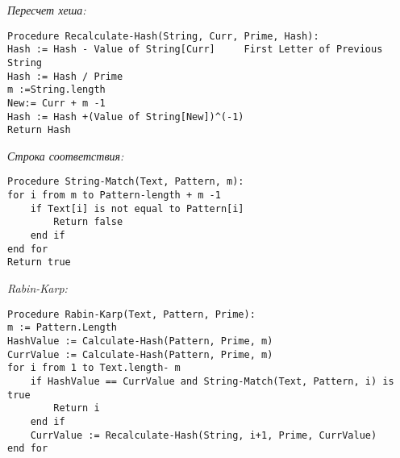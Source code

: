 \textit{Пересчет хеша:}

\vspace{\baselineskip}
\begin{tcolorbox}
\begin{verbatim}
Procedure Recalculate-Hash(String, Curr, Prime, Hash):
Hash := Hash - Value of String[Curr]	 First Letter of Previous String
Hash := Hash / Prime
m :=String.length
New:= Curr + m -1
Hash := Hash +(Value of String[New])^(-1)
Return Hash
\end{verbatim}
\end{tcolorbox}
\vspace{\baselineskip}

\textit{Строка соответствия:}

\vspace{\baselineskip}
\begin{tcolorbox}
\begin{verbatim}
Procedure String-Match(Text, Pattern, m):
for i from m to Pattern-length + m -1
	if Text[i] is not equal to Pattern[i]
		Return false
	end if
end for
Return true
\end{verbatim}
\end{tcolorbox}
\vspace{\baselineskip}

\textit{Rabin-Karp:}

\vspace{\baselineskip}
\begin{tcolorbox}
\begin{verbatim}
Procedure Rabin-Karp(Text, Pattern, Prime):
m := Pattern.Length
HashValue := Calculate-Hash(Pattern, Prime, m)
CurrValue := Calculate-Hash(Pattern, Prime, m)
for i from 1 to Text.length- m
	if HashValue == CurrValue and String-Match(Text, Pattern, i) is true
		Return i
	end if	
	CurrValue := Recalculate-Hash(String, i+1, Prime, CurrValue)
end for
\end{verbatim}
\end{tcolorbox}
\vspace{\baselineskip}